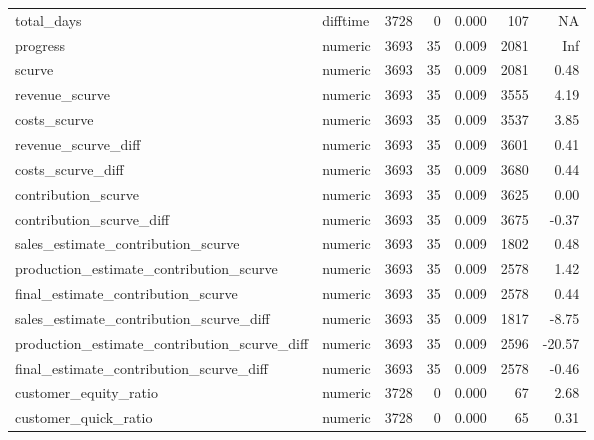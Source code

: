 \begin{landscape}
\begin{longtable}[t]{llrrrrr}
total\_days & difftime & 3728 & 0 & 0.000 & 107 & NA\\
progress & numeric & 3693 & 35 & 0.009 & 2081 & Inf\\
scurve & numeric & 3693 & 35 & 0.009 & 2081 & 0.48\\
revenue\_scurve & numeric & 3693 & 35 & 0.009 & 3555 & 4.19\\
costs\_scurve & numeric & 3693 & 35 & 0.009 & 3537 & 3.85\\
revenue\_scurve\_diff & numeric & 3693 & 35 & 0.009 & 3601 & 0.41\\
costs\_scurve\_diff & numeric & 3693 & 35 & 0.009 & 3680 & 0.44\\
contribution\_scurve & numeric & 3693 & 35 & 0.009 & 3625 & 0.00\\
contribution\_scurve\_diff & numeric & 3693 & 35 & 0.009 & 3675 & -0.37\\
sales\_estimate\_contribution\_scurve & numeric & 3693 & 35 & 0.009 & 1802 & 0.48\\
production\_estimate\_contribution\_scurve & numeric & 3693 & 35 & 0.009 & 2578 & 1.42\\
final\_estimate\_contribution\_scurve & numeric & 3693 & 35 & 0.009 & 2578 & 0.44\\
sales\_estimate\_contribution\_scurve\_diff & numeric & 3693 & 35 & 0.009 & 1817 & -8.75\\
production\_estimate\_contribution\_scurve\_diff & numeric & 3693 & 35 & 0.009 & 2596 & -20.57\\
final\_estimate\_contribution\_scurve\_diff & numeric & 3693 & 35 & 0.009 & 2578 & -0.46\\
customer\_equity\_ratio & numeric & 3728 & 0 & 0.000 & 67 & 2.68\\
customer\_quick\_ratio & numeric & 3728 & 0 & 0.000 & 65 & 0.31\\*
\end{longtable}
\end{landscape}
\endgroup{}
